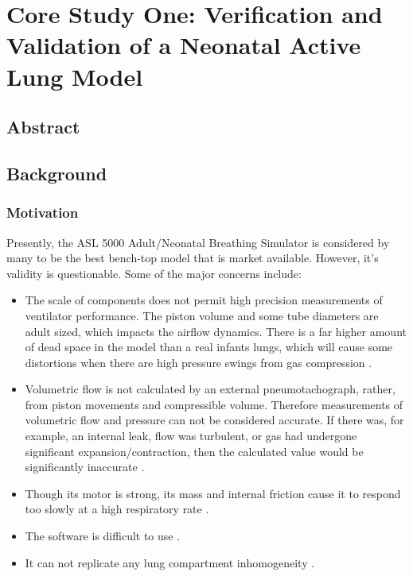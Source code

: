 \documentclass[12pt, openany, oneside]{book}
\begin{document}
\chapter{Core Study One: Verification and Validation of a Neonatal Active Lung Model}
\section{Abstract}
\section{Background}
\subsection{Motivation}
Presently, the ASL 5000 Adult/Neonatal Breathing Simulator is considered by many to be the best bench-top model that is market available. However, it’s validity is questionable. Some of the major concerns include:

\begin{itemize}
\item{The scale of components does not permit high precision measurements of ventilator performance. The piston volume and some tube diameters are adult sized, which impacts the airflow dynamics. There is a far higher amount of dead space in the model than a real infants lungs, which will cause some distortions when there are high pressure swings from gas compression \citep{thomas}.}
\item{Volumetric flow is not calculated by an external pneumotachograph, rather, from piston movements and compressible volume. Therefore measurements of volumetric flow and pressure can not be considered accurate. If there was, for example, an internal leak, flow was turbulent, or gas had undergone significant expansion/contraction, then the calculated value would be significantly inaccurate \citep{thomas}.}
\item{Though its motor is strong, its mass and internal friction cause it to respond too slowly at a high respiratory rate \citep{thomas}.}
\item{The software is difficult to use \citep{thomas}.}
\item{It can not replicate any lung compartment inhomogeneity \citep{stank2017}.}
\end{itemize}
\end{document}
